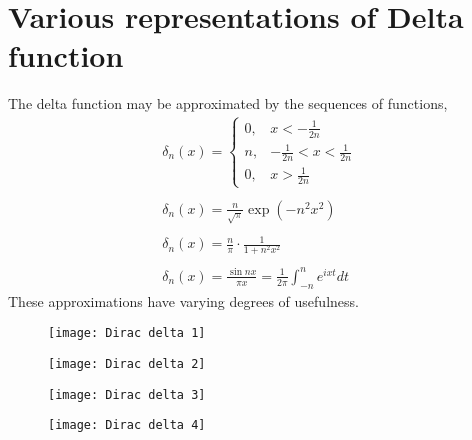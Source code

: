 \section{Various representations of Delta function}
 The delta function may be approximated by the sequences of functions, 
 $$
 \begin{array}{l}
 \delta_{n}(x)=\left\{\begin{array}{ll}
 0, & x<-\frac{1}{2 n} \\
 n, & -\frac{1}{2 n}<x<\frac{1}{2 n} \\
 0, & x>\frac{1}{2 n}
 \end{array}\right. \\\\
 \delta_{n}(x)=\frac{n}{\sqrt{\pi}} \exp \left(-n^{2} x^{2}\right) \\\\
 \delta_{n}(x)=\frac{n}{\pi} \cdot \frac{1}{1+n^{2} x^{2}} \\\\
 \delta_{n}(x)=\frac{\sin n x}{\pi x}=\frac{1}{2 \pi} \int_{-n}^{n} e^{i x t} d t
 \end{array}
 $$
 These approximations have varying degrees of usefulness.\\
 \begin{minipage}{0.45\textwidth}
 	\begin{figure}[H]
 		\centering
 		\texttt{[image: Dirac delta 1]}
 	\end{figure}
 \begin{figure}[H]
 	\centering
 	\texttt{[image: Dirac delta 2]}
 \end{figure}
 \end{minipage}
\begin{minipage}{0.45\textwidth}
	\begin{figure}[H]
		\centering
		\texttt{[image: Dirac delta 3]}
	\end{figure}
	\begin{figure}[H]
		\centering
		\texttt{[image: Dirac delta 4]}
	\end{figure}
\end{minipage}
 
